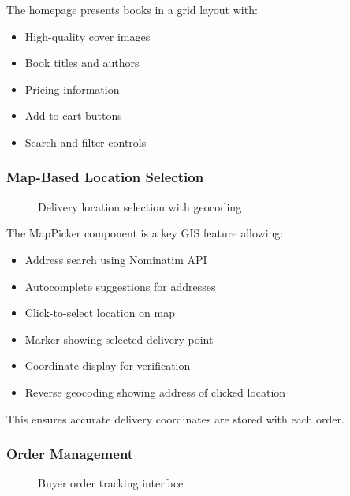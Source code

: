 \documentclass[12pt,a4paper]{article}
\begin{document}
The homepage presents books in a grid layout with:
\begin{itemize}
    \item High-quality cover images
    \item Book titles and authors
    \item Pricing information
    \item Add to cart buttons
    \item Search and filter controls
\end{itemize}

\subsubsection{Map-Based Location Selection}

\begin{figure}[h]
    \centering
    \caption{Delivery location selection with geocoding}
\end{figure}

The MapPicker component is a key GIS feature allowing:
\begin{itemize}
    \item Address search using Nominatim API
    \item Autocomplete suggestions for addresses
    \item Click-to-select location on map
    \item Marker showing selected delivery point
    \item Coordinate display for verification
    \item Reverse geocoding showing address of clicked location
\end{itemize}

This ensures accurate delivery coordinates are stored with each order.

\subsubsection{Order Management}

\begin{figure}[h]
    \centering
    \caption{Buyer order tracking interface}
\end{figure}
\end{document}
